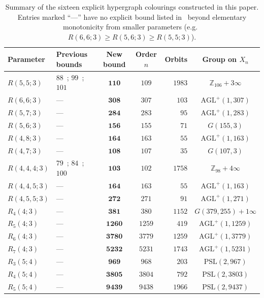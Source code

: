\documentclass[11pt]{article}
\theoremstyle{remark}
\newcommand{\Z}{\mathbb{Z}}
\begin{document}
\begin{table}[ht!]
\centering
\footnotesize
\setlength{\tabcolsep}{4.8pt}
\begin{tabular}{llccrc}
\toprule
Parameter & Previous bounds & New bound & Order $n$ & Orbits & Group on $X_n$ \\
\midrule
$R(5,5;3)$ & $88$~\cite{survey}; $99$~\cite{lysenstoen1}; $101$~\cite{lysenstoen2} & $\mathbf{110}$ & $109$ & $1983$ & $\Z_{106}+3\infty$ \\
$R(6,6;3)$ & --- & $\mathbf{308}$ & $307$ & $103$ & $\mathrm{AGL}^+(1,307)$ \\
$R(5,7;3)$ & --- & $\mathbf{284}$ & $283$ & $95$ & $\mathrm{AGL}^+(1,283)$ \\
$R(5,6;3)$ & --- & $\mathbf{156}$ & $155$ & $71$ & $G(155,3)$ \\
$R(4,8;3)$ & --- & $\mathbf{164}$ & $163$ & $55$ & $\mathrm{AGL}^+(1,163)$ \\
$R(4,7;3)$ & --- & $\mathbf{108}$ & $107$ & $35$ & $G(107,3)$ \\
\midrule
$R(4,4,4;3)$ & $79$~\cite{survey}; $84$~\cite{yang}; $100$~\cite{hashimoto1} & $\mathbf{103}$ & $102$ & $1758$ & $\Z_{98}+4\infty$ \\
$R(4,4,5;3)$ & --- & $\mathbf{164}$ & $163$ & $55$ & $\mathrm{AGL}^+(1,163)$ \\
$R(4,5,5;3)$ & --- & $\mathbf{272}$ & $271$ & $91$ & $\mathrm{AGL}^+(1,271)$ \\
$R_4(4;3)$ & --- & $\mathbf{381}$ & $380$ & $1152$ & $G(379,255)+1\infty$ \\
$R_5(4;3)$ & --- & $\mathbf{1260}$ & $1259$ & $419$ & $\mathrm{AGL}^+(1,1259)$ \\
$R_6(4;3)$ & --- & $\mathbf{3780}$ & $3779$ & $1259$ & $\mathrm{AGL}^+(1,3779)$ \\
$R_7(4;3)$ & --- & $\mathbf{5232}$ & $5231$ & $1743$ & $\mathrm{AGL}^+(1,5231)$ \\
\midrule
$R_3(5;4)$ & --- & $\mathbf{969}$ & $968$ & $203$ & $\mathrm{PSL}(2,967)$ \\
$R_4(5;4)$ & --- & $\mathbf{3805}$ & $3804$ & $792$ & $\mathrm{PSL}(2,3803)$ \\
$R_5(5;4)$ & --- & $\mathbf{9439}$ & $9438$ & $1966$ & $\mathrm{PSL}(2,9437)$ \\
\bottomrule
\end{tabular}
\caption{Summary of the sixteen explicit hypergraph colourings constructed in
this paper. Entries marked ``---'' have no explicit bound listed in~\cite[Section~7.1]{survey}
beyond elementary monotonicity from smaller parameters (e.g.\ $R(6,6;3)\ge R(5,6;3)\ge R(5,5;3)$).}
\label{tab:all16}
\end{table}
\end{document}
